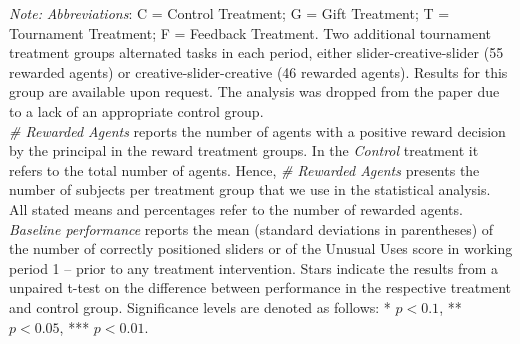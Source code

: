 \begin{landscape}
\begin{table}
\begin{center}
{\begin{tabular}[t]{|l|c|c|c|c|c|c||c|c|c|c||c|}
\hline
\end{tabular}}
\begin{minipage}{0.98\linewidth}
\footnotesize
\vspace{5mm}
{\it Note:}\textit{ Abbreviations}: C  =  Control Treatment; G  =  Gift Treatment; T  =  Tournament Treatment; F  =  Feedback Treatment. Two additional tournament treatment groups alternated tasks in each period, either slider-creative-slider (55 rewarded agents) or creative-slider-creative (46 rewarded agents). Results for this group are available upon request. The analysis was dropped from the paper due to a lack of an appropriate control group. \\ 
 \textit{\# Rewarded Agents} reports the number of agents with a positive reward decision by the principal in the reward treatment groups. In the \textit{Control} treatment it refers to the total number of agents. Hence, \textit{\# Rewarded Agents} presents the number of subjects per treatment group that we use in the statistical analysis. All stated means and percentages refer to the number of rewarded agents. \\ 
\hspace{3mm}\textit{Baseline performance} reports the mean (standard deviations in parentheses) of the number of correctly positioned sliders or of the Unusual Uses score in working period 1 -- prior to any treatment intervention. 
Stars indicate the results from a unpaired t-test on the difference between performance in the respective treatment and control group. Significance levels are denoted as follows: * $p < 0.1$, ** $p < 0.05$, *** $p < 0.01$.
\end{minipage}
\label{tab:Summary_Statistics_Appendix}
\end{center}
\end{table}
\end{landscape}

